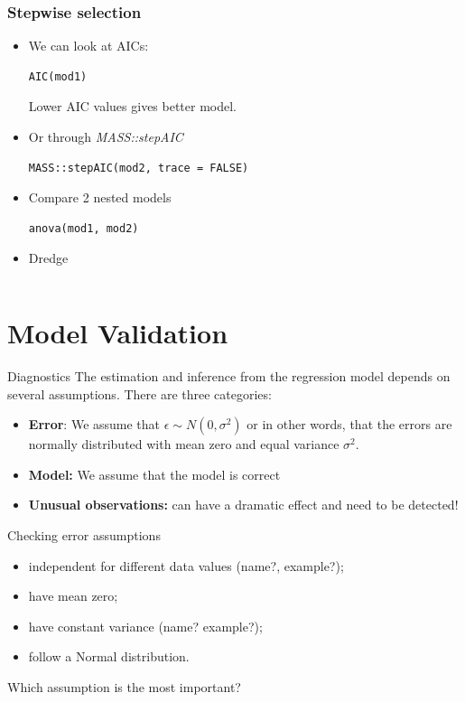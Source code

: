 \documentclass{beamer}
\begin{document}
\begin{frame}[fragile]
\frametitle{Stepwise selection}
\begin{itemize}
\item We can look at AICs:
\begin{lstlisting}
AIC(mod1)
\end{lstlisting}
Lower AIC values gives better model.

\item Or through \textit{MASS::stepAIC}
\begin{lstlisting}
MASS::stepAIC(mod2, trace = FALSE)
\end{lstlisting}

\item Compare 2 nested models 
\begin{lstlisting}
anova(mod1, mod2)
\end{lstlisting}

\item Dredge 
\begin{lstlisting}

\end{lstlisting}
\end{itemize}
\end{frame}



\section{Model Validation}

\begin{frame}{Diagnostics} 
The estimation and inference from the regression model depends on several assumptions.
There are three categories:
\begin{itemize}
\item \textbf{Error}: 
We assume that $\epsilon \sim N(0, \sigma^{2})$ or in other words, that the errors are normally distributed with mean zero and equal variance $\sigma^2$. 
\item \textbf{Model:} 
We assume that the model is correct

\item \textbf{Unusual observations:} can have a dramatic effect and need to be detected!
\end{itemize}
\end{frame}


\begin{frame}{Checking error assumptions} 
\begin{itemize}
	\item independent for different data values (name?, example?);
	\item have mean zero; 
	\item have constant variance (name? example?);
	\item follow a Normal distribution.
\end{itemize}

\pause
\vspace{1cm}
Which assumption is the most important?
\end{frame}
\end{document}
